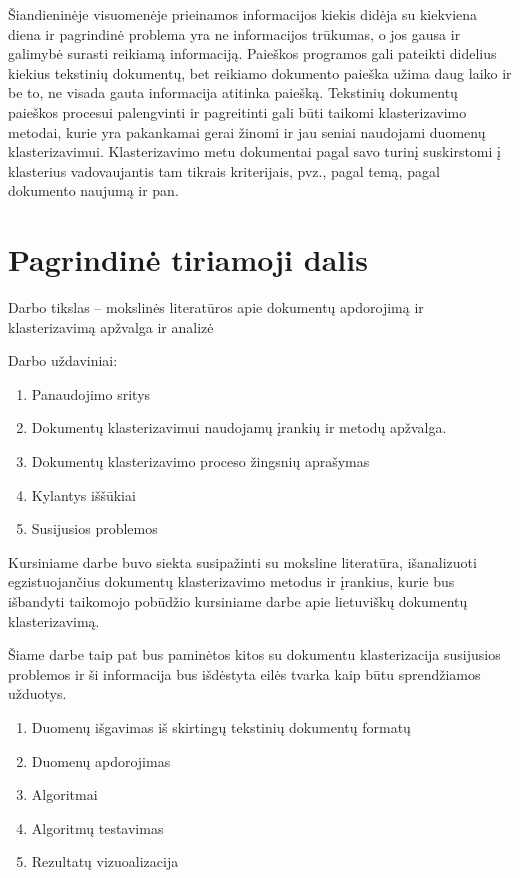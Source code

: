 \documentclass{VUMIFInfKursinis}
\begin{document}
Šiandieninėje visuomenėje prieinamos informacijos kiekis didėja su kiekviena diena ir pagrindinė problema yra ne informacijos trūkumas, o jos gausa ir galimybė surasti reikiamą informaciją. Paieškos programos gali pateikti didelius kiekius tekstinių dokumentų, bet reikiamo dokumento paieška užima daug laiko ir be to, ne visada gauta informacija atitinka paiešką. Tekstinių dokumentų paieškos procesui palengvinti ir pagreitinti gali būti taikomi klasterizavimo metodai, kurie yra pakankamai gerai žinomi ir jau seniai naudojami duomenų klasterizavimui.  Klasterizavimo metu  dokumentai pagal savo turinį suskirstomi į klasterius vadovaujantis tam tikrais kriterijais, pvz., pagal temą, pagal dokumento naujumą ir pan. 



\section{Pagrindinė tiriamoji dalis}
Darbo tikslas – mokslinės literatūros apie dokumentų apdorojimą ir klasterizavimą apžvalga ir analizė  

Darbo uždaviniai: 
\begin{enumerate}
	\item Panaudojimo sritys
	\item Dokumentų klasterizavimui naudojamų įrankių ir metodų apžvalga.
	\item Dokumentų klasterizavimo proceso žingsnių aprašymas
	\item Kylantys iššūkiai  
	\item Susijusios problemos 
\end{enumerate}

Kursiniame darbe buvo siekta susipažinti su moksline literatūra, išanalizuoti egzistuojančius dokumentų klasterizavimo metodus ir įrankius, kurie bus išbandyti taikomojo pobūdžio  kursiniame darbe apie lietuviškų dokumentų klasterizavimą.

Šiame darbe taip pat bus paminėtos kitos su dokumentu klasterizacija susijusios problemos ir ši informacija bus išdėstyta eilės tvarka kaip būtu sprendžiamos užduotys.
\begin{enumerate}
	\item Duomenų išgavimas iš skirtingų tekstinių dokumentų formatų
	\item Duomenų apdorojimas
	\item Algoritmai
	\item Algoritmų testavimas
	\item Rezultatų vizuoalizacija
\end{enumerate}
\end{document}
